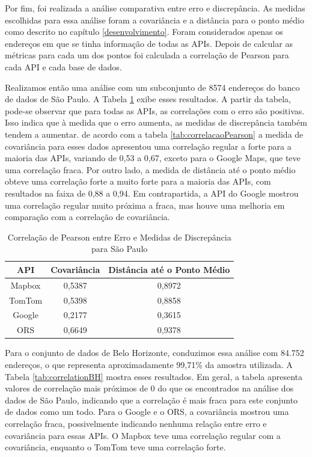 Por fim, foi realizada a análise comparativa entre erro e discrepância. As medidas escolhidas para essa análise foram a covariância e a distância para o ponto médio como descrito no capítulo \ref{desenvolvimento}. Foram considerados apenas os endereços em que se tinha informação de todas as APIs. Depois de calcular as métricas para cada um dos pontos foi calculada a correlação de Pearson para cada API e cada base de dados.  

Realizamos então uma análise com um subconjunto de 8574 endereços do banco de dados de São Paulo. A Tabela \ref{tab:correlationSP} exibe esses resultados. A partir da tabela, pode-se observar que para todas as APIs, as correlações com o erro são positivas. Isso indica que à medida que o erro aumenta, as medidas de discrepância também tendem a aumentar. de acordo com a tabela \ref{tab:correlacaoPearson} a medida de covariância para esses dados apresentou uma correlação regular a forte para a maioria das APIs, variando de 0,53 a 0,67, exceto para o Google Maps, que teve uma correlação fraca. Por outro lado, a medida de distância até o ponto médio obteve uma correlação forte a muito forte para a maioria das APIs, com resultados na faixa de 0,88 a 0,94. Em contrapartida, a API do Google mostrou uma correlação regular muito próxima a fraca, mas houve uma melhoria em comparação com a correlação de covariância.

\begin{table}[h]
\centering
\caption{Correlação  de Pearson entre Erro e Medidas de Discrepância para São Paulo}
\label{tab:correlationSP}
\begin{adjustbox}{width=0.7\textwidth}
\begin{tabular}{|c|c|c|}
\hline
API & Covariância & Distância até o Ponto Médio \\
\hline
Mapbox & 0,5387 & 0,8972 \\
TomTom & 0,5398 & 0,8858 \\
Google & 0,2177 & 0,3615 \\
ORS & 0,6649 & 0,9378 \\
\hline
\end{tabular}
\end{adjustbox}
\end{table}

Para o conjunto de dados de Belo Horizonte, conduzimos essa análise com 84.752 endereços, o que representa aproximadamente 99,71\% da amostra utilizada. A Tabela \ref{tab:correlationBH} mostra esses resultados. Em geral, a tabela apresenta valores de correlação mais próximos de 0 do que os encontrados na análise dos dados de São Paulo, indicando que a correlação é mais fraca para este conjunto de dados como um todo. Para o Google e o ORS, a covariância mostrou uma correlação fraca, possivelmente indicando nenhuma relação entre erro e covariância para essas APIs. O Mapbox teve uma correlação regular com a covariância, enquanto o TomTom teve uma correlação forte.

